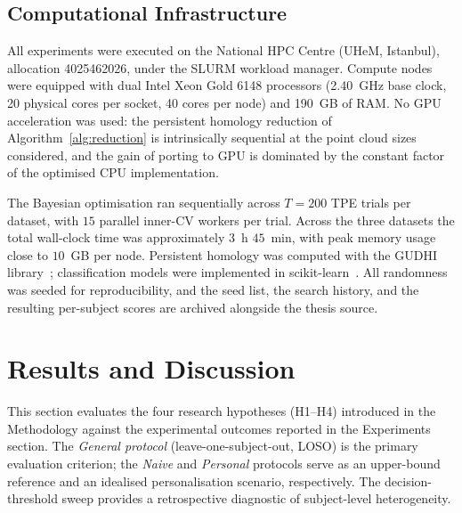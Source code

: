 \documentclass[onluarkali,ingilizce,yukseklisans,karton,LisansustuEgitim]{itutez}
\providecommand{\1}{\mathbf{1}}
\begin{document}
\section{Computational Infrastructure}
\label{subsec:compute}

All experiments were executed on the National HPC Centre (UHeM, Istanbul), allocation 4025462026, under the SLURM workload manager. Compute nodes were equipped with dual Intel Xeon Gold 6148 processors (2.40~GHz base clock, 20 physical cores per socket, 40 cores per node) and 190~GB of RAM. No GPU acceleration was used: the persistent homology reduction of Algorithm~\ref{alg:reduction} is intrinsically sequential at the point cloud sizes considered, and the gain of porting to GPU is dominated by the constant factor of the optimised CPU implementation.

The Bayesian optimisation ran sequentially across $T=200$ TPE trials per dataset, with $15$ parallel inner-CV workers per trial. Across the three datasets the total wall-clock time was approximately $3$~h $45$~min, with peak memory usage close to $10$~GB per node. Persistent homology was computed with the GUDHI library~\parencite{gudhi}; classification models were implemented in scikit-learn~\parencite{scikit-learn}. All randomness was seeded for reproducibility, and the seed list, the search history, and the resulting per-subject scores are archived alongside the thesis source.



\chapter{Results and Discussion}
\label{sec:results}

This section evaluates the four research hypotheses (H1--H4) introduced in the
Methodology against the experimental outcomes reported in the Experiments section.
The \emph{General protocol} (leave-one-subject-out, LOSO) is the primary evaluation
criterion; the \emph{Naive} and \emph{Personal} protocols serve as an upper-bound
reference and an idealised personalisation scenario, respectively.  The
decision-threshold sweep provides a retrospective diagnostic of subject-level
heterogeneity.
\end{document}

